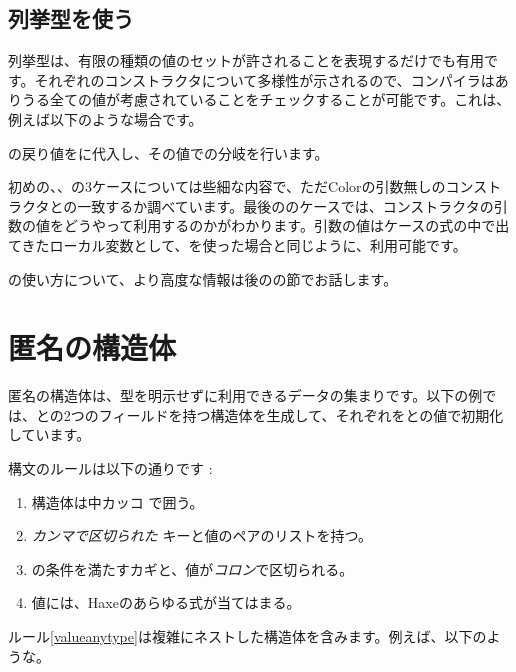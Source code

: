 \subsection{列挙型を使う}
\label{types-enum-using}

列挙型は、有限の種類の値のセットが許されることを表現するだけでも有用です。それぞれのコンストラクタについて多様性が示されるので、コンパイラはありうる全ての値が考慮されていることをチェックすることが可能です。これは、例えば以下のような場合です。


の戻り値をに代入し、その値での分岐を行います。

初めの、、の3ケースについては些細な内容で、ただColorの引数無しのコンストラクタとの一致するか調べています。最後ののケースでは、コンストラクタの引数の値をどうやって利用するのかがわかります。引数の値はケースの式の中で出てきたローカル変数として、を使った場合と同じように、利用可能です。

の使い方について、より高度な情報は後のの節でお話します。


\section{匿名の構造体}
\label{types-anonymous-structure}

匿名の構造体は、型を明示せずに利用できるデータの集まりです。以下の例では、との2つのフィールドを持つ構造体を生成して、それぞれをとの値で初期化しています。


構文のルールは以下の通りです :

\begin{enumerate}
	\item 構造体は中カッコ \expr{$\left\{\right\}$} で囲う。
	\item \emph{カンマで区切られた} キーと値のペアのリストを持つ。
	\item {}の条件を満たすカギと、値が\emph{コロン}で区切られる。
	\item\label{valueanytype} 値には、Haxeのあらゆる式が当てはまる。
\end{enumerate}
ルール\ref{valueanytype}は複雑にネストした構造体を含みます。例えば、以下のような。


